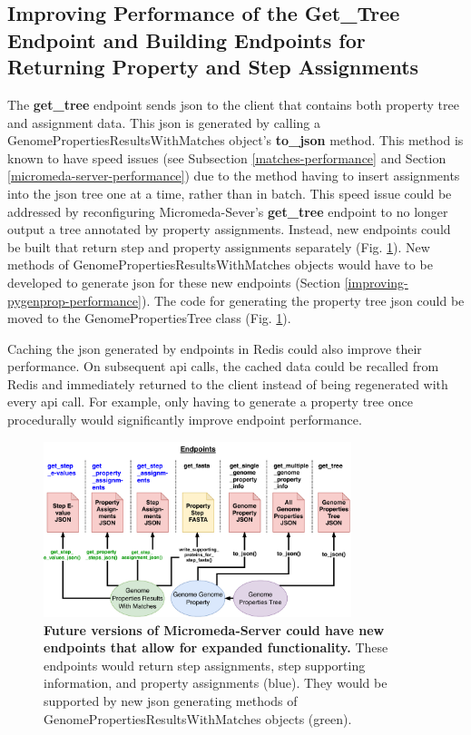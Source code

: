 \subsection{Improving Performance of the Get\_Tree Endpoint and Building 
Endpoints for Returning Property and Step Assignments} 
\label{assignment-endpoints}

The \textbf{get\_tree} endpoint sends \gls{json} to the client that contains 
both property tree and assignment data. This \gls{json} is generated by calling 
a GenomePropertiesResultsWithMatches object's \textbf{to\_json} method. This 
method is known to have speed issues (see Subsection \ref{matches-performance} 
and Section \ref{micromeda-server-performance}) due to the method having to 
insert assignments into the \gls{json} tree one at a time, rather than in batch. 
This speed issue could be addressed by reconfiguring Micromeda-Sever's 
\textbf{get\_tree} endpoint to no longer output a tree annotated by property 
assignments. Instead, new endpoints could be built that return step and property 
assignments separately (Fig. \ref{fig:new_endpoints}). New methods of 
GenomePropertiesResultsWithMatches objects would have to be developed to 
generate \gls{json} for these new endpoints (Section 
\ref{improving-pygenprop-performance}). The code for generating the property 
tree \gls{json} could be moved to the GenomePropertiesTree class (Fig. 
\ref{fig:new_endpoints}).

Caching the \gls{json} generated by endpoints in Redis could also improve their 
performance. On subsequent \gls{api} calls, the cached data could be recalled 
from Redis and immediately returned to the client instead of being regenerated 
with every \gls{api} call. For example, only having to generate a property tree 
once procedurally would significantly improve endpoint performance.

\begin{figure}[!ht]
  \centering
	\includegraphics[width=0.8\textwidth]{media/micromeda-server-new-endpoints.pdf}
	 \caption[Future versions of Micromeda-Server could have new endpoints that 
allow for expanded functionality.]{\textbf{Future versions of Micromeda-Server 
could have new endpoints that allow for expanded functionality.} These endpoints 
would return step assignments, step supporting information, and property 
assignments (blue). They would be supported by new \gls{json} generating methods 
of GenomePropertiesResultsWithMatches objects (green).}
	 \label{fig:new_endpoints}
\end{figure}

